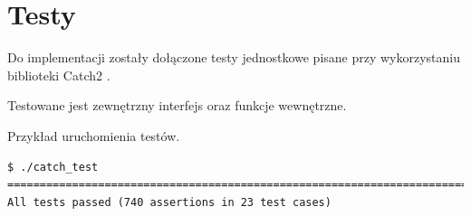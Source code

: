 \section{Testy}
Do implementacji zostały dołączone testy jednostkowe pisane przy wykorzystaniu biblioteki Catch2 \cite{catch}.

Testowane jest zewnętrzny interfejs oraz funkcje wewnętrzne.

Przykład uruchomienia testów.
\begin{lstlisting}
$ ./catch_test 
===============================================================================
All tests passed (740 assertions in 23 test cases)
\end{lstlisting}

